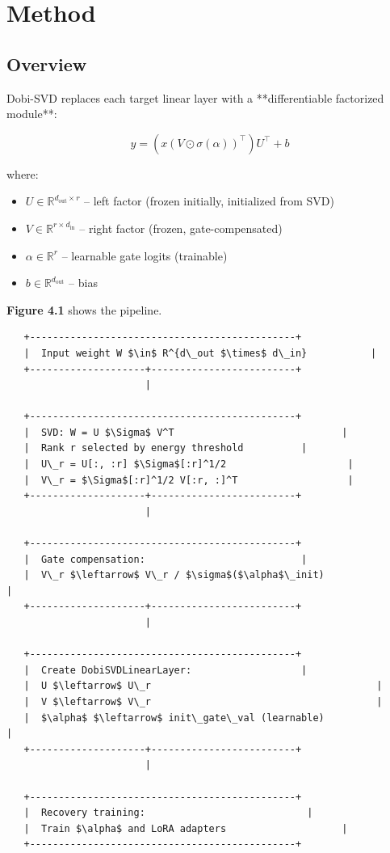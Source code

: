 
\section{Method}

\subsection{Overview}

Dobi-SVD replaces each target linear layer with a **differentiable 
factorized module**:

\[
y = (x (V \odot \sigma(\alpha))^\top) U^\top + b
\tag{4.1}
\]

where:

\begin{itemize}
\item $U \in \mathbb{R}^{d_\text{out} \times r}$ -- left factor (frozen initially, initialized from SVD)
\item $V \in \mathbb{R}^{r \times d_\text{in}}$ -- right factor (frozen, gate-compensated)
\item $\alpha \in \mathbb{R}^r$ -- learnable gate logits (trainable)
\item $b \in \mathbb{R}^{d_\text{out}}$ -- bias

\end{itemize}
\textbf{Figure 4.1} shows the pipeline.

\begin{lstlisting}
   +----------------------------------------------+
   |  Input weight W $\in$ R^{d\_out $\times$ d\_in}           |
   +--------------------+-------------------------+
                        |
                         
   +----------------------------------------------+
   |  SVD: W = U $\Sigma$ V^T                             |
   |  Rank r selected by energy threshold          |
   |  U\_r = U[:, :r] $\Sigma$[:r]^1/2                     |
   |  V\_r = $\Sigma$[:r]^1/2 V[:r, :]^T                   |
   +--------------------+-------------------------+
                        |
                         
   +----------------------------------------------+
   |  Gate compensation:                           |
   |  V\_r $\leftarrow$ V\_r / $\sigma$($\alpha$\_init)                        |
   +--------------------+-------------------------+
                        |
                         
   +----------------------------------------------+
   |  Create DobiSVDLinearLayer:                   |
   |  U $\leftarrow$ U\_r                                       |
   |  V $\leftarrow$ V\_r                                       |
   |  $\alpha$ $\leftarrow$ init\_gate\_val (learnable)                |
   +--------------------+-------------------------+
                        |
                         
   +----------------------------------------------+
   |  Recovery training:                            |
   |  Train $\alpha$ and LoRA adapters                    |
   +----------------------------------------------+
\end{lstlisting}

